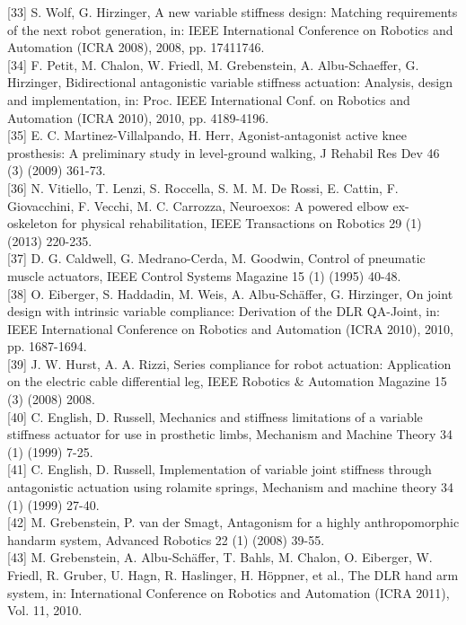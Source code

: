 \documentclass[10pt]{article}
\begin{document}
[33] S. Wolf, G. Hirzinger, A new variable stiffness design: Matching requirements of the next robot generation, in: IEEE International Conference on Robotics and Automation (ICRA 2008), 2008, pp. 17411746.\\[0pt]
[34] F. Petit, M. Chalon, W. Friedl, M. Grebenstein, A. Albu-Schaeffer, G. Hirzinger, Bidirectional antagonistic variable stiffness actuation: Analysis, design and implementation, in: Proc. IEEE International Conf. on Robotics and Automation (ICRA 2010), 2010, pp. 4189-4196.\\[0pt]
[35] E. C. Martinez-Villalpando, H. Herr, Agonist-antagonist active knee prosthesis: A preliminary study in level-ground walking, J Rehabil Res Dev 46 (3) (2009) 361-73.\\[0pt]
[36] N. Vitiello, T. Lenzi, S. Roccella, S. M. M. De Rossi, E. Cattin, F. Giovacchini, F. Vecchi, M. C. Carrozza, Neuroexos: A powered elbow ex-\\
oskeleton for physical rehabilitation, IEEE Transactions on Robotics 29 (1) (2013) 220-235.\\[0pt]
[37] D. G. Caldwell, G. Medrano-Cerda, M. Goodwin, Control of pneumatic muscle actuators, IEEE Control Systems Magazine 15 (1) (1995) 40-48.\\[0pt]
[38] O. Eiberger, S. Haddadin, M. Weis, A. Albu-Schäffer, G. Hirzinger, On joint design with intrinsic variable compliance: Derivation of the DLR QA-Joint, in: IEEE International Conference on Robotics and Automation (ICRA 2010), 2010, pp. 1687-1694.\\[0pt]
[39] J. W. Hurst, A. A. Rizzi, Series compliance for robot actuation: Application on the electric cable differential leg, IEEE Robotics \& Automation Magazine 15 (3) (2008) 2008.\\[0pt]
[40] C. English, D. Russell, Mechanics and stiffness limitations of a variable stiffness actuator for use in prosthetic limbs, Mechanism and Machine Theory 34 (1) (1999) 7-25.\\[0pt]
[41] C. English, D. Russell, Implementation of variable joint stiffness through antagonistic actuation using rolamite springs, Mechanism and machine theory 34 (1) (1999) 27-40.\\[0pt]
[42] M. Grebenstein, P. van der Smagt, Antagonism for a highly anthropomorphic handarm system, Advanced Robotics 22 (1) (2008) 39-55.\\[0pt]
[43] M. Grebenstein, A. Albu-Schäffer, T. Bahls, M. Chalon, O. Eiberger, W. Friedl, R. Gruber, U. Hagn, R. Haslinger, H. Höppner, et al., The DLR hand arm system, in: International Conference on Robotics and Automation (ICRA 2011), Vol. 11, 2010.\\[0pt]
\end{document}
